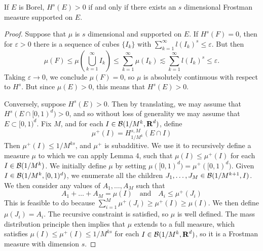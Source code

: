 
\begin{lemma}
	If $E$ is Borel, $H^s(E) > 0$ if and only if there exists an $s$ dimensional Frostman measure supported on $E$.
\end{lemma}
\begin{proof}
	Suppose that $\mu$ is $s$ dimensional and supported on $E$. If $H^s(F) = 0$, then for $\varepsilon > 0$ there is a sequence of cubes $\{ I_k \}$ with $\sum_{k = 1}^\infty l(I_k)^s \leq \varepsilon$. But then
	\[ \mu(F) \leq \mu \left( \bigcup_{k = 1}^\infty I_k \right) \leq \sum_{k = 1}^\infty \mu(I_k) \lesssim \sum_{k = 1}^\infty l(I_k)^s \leq \varepsilon. \]
	Taking $\varepsilon \to 0$, we conclude $\mu(F) = 0$, so $\mu$ is absolutely continuous with respect to $H^s$. But since $\mu(E) > 0$, this means that $H^s(E) > 0$.

	Conversely, suppose $H^s(E) > 0$. Then by translating, we may assume that $H^s(E \cap [0,1)^d) > 0$, and so without loss of generality we may assume that $E \subset [0,1)^d$. Fix $M$, and for each $I \in \operatorname{\mathcal{B}}(1/M^k,\operatorname{\mathbf{R}}^d)$, define
	\[ \mu^+(I) = H^{s,M}_{1/M^k}(E \cap I) \]
	Then $\mu^+(I) \leq 1/M^{ks}$, and $\mu^+$ is subadditive. We use it to recursively define a measure $\mu$ to which we can apply Lemma 4, such that $\mu(I) \leq \mu^+(I)$ for each $I \in \operatorname{\mathcal{B}}(1/M^k)$. We initially define $\mu$ by setting $\mu([0,1)^d) = \mu^+([0,1)^d)$. Given $I \in \operatorname{\mathcal{B}}(1/M^k,[0,1)^d)$, we enumerate all the children $J_1, \dots, J_M \in \operatorname{\mathcal{B}}(1/M^{k+1},I)$. We then consider any values of $A_1, \dots, A_M$ such that
	\[ A_1 + \dots + A_M = \mu(I)\quad\text{and}\quad A_i \leq \mu^+(J_i) \]
	This is feasible to do because $\sum_{i = 1}^M \mu^+(J_i) \geq \mu^+(I) \geq \mu(I)$. We then define $\mu(J_i) = A_i$. The recursive constraint is satisfied, so $\mu$ is well defined. The mass distribution principle then implies that $\mu$ extends to a full measure, which satisfies $\mu(I) \leq \mu^+(I) \leq 1/M^{ks}$ for each $I \in \operatorname{\mathcal{B}}(1/M^k,\operatorname{\mathbf{R}}^d)$, so it is a Frostman measure with dimension $s$.
\end{proof}







